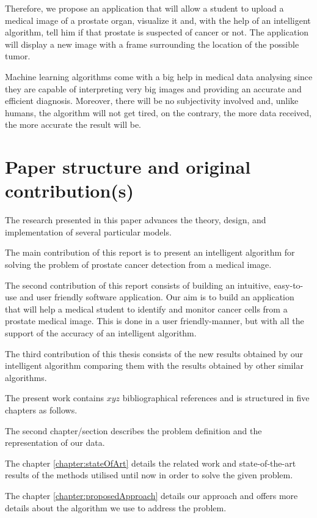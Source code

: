 \documentclass[runningheads,a4paper,11pt]{report}
\begin{document}
Therefore, we propose an application that will allow a student to upload a medical image of a prostate organ, visualize it and, with the help of an intelligent algorithm, tell him if that prostate is suspected of cancer or not. The application will display a new image with a frame surrounding the location of the possible tumor.

Machine learning algorithms come with a big help in medical data analysing since they are capable of interpreting very big images and providing an accurate and efficient diagnosis. Moreover, there will be no subjectivity involved and, unlike humans, the algorithm will not get tired, on the contrary, the more data received, the more accurate the result will be.\cite{imageProcessing}

\section{Paper structure and original contribution(s)}
\label{section:structure}

The research presented in this paper advances the theory, design, and implementation of several particular models. 

The main contribution of this report is to present an intelligent algorithm for solving the problem of prostate cancer detection from a medical image.

The second contribution of this report consists of building an intuitive, easy-to-use and user
friendly software application. Our aim is to build an application that will help a medical student to identify and monitor cancer cells from a prostate medical image. This is done in a user friendly-manner, but with all the support of the accuracy of an intelligent algorithm.

The third contribution of this thesis consists of the new results obtained by our intelligent algorithm comparing them with the results obtained by other similar algorithms.


The present work contains $xyz$ bibliographical references and is structured in five chapters as follows.

The second chapter/section describes the problem definition and the representation of our data.

The chapter \ref{chapter:stateOfArt} details  the related work and state-of-the-art results of the methods utilised until now in order to solve the given problem.

The chapter \ref{chapter:proposedApproach} details our approach and offers more details about the algorithm we use to address the problem. 
\end{document}
